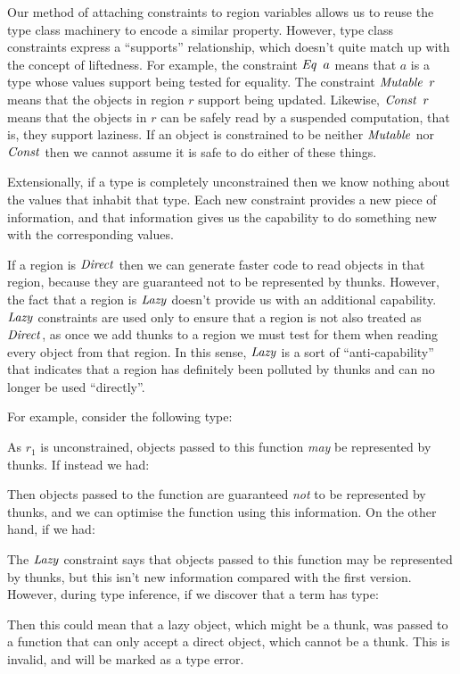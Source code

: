 Our method of attaching constraints to region variables allows us to reuse the type class machinery to encode a similar property. However, type class constraints express a ``supports'' relationship, which doesn't quite match up with the concept of liftedness. For example, the constraint $\operatorname{\mathit{Eq}} \ a$ means that $a$ is a type whose values support being tested for equality. The constraint $\operatorname{\mathit{Mutable}} \ r$ means that the objects in region $r$ support being updated. Likewise, $\iConst \ r$ means that the objects in $r$ can be safely read by a suspended computation, that is, they support laziness. If an object is constrained to be neither $\operatorname{\mathit{Mutable}}$ nor $\operatorname{\mathit{Const}}$ then we cannot assume it is safe to do either of these things. 

Extensionally, if a type is completely unconstrained then we know nothing about the values that inhabit that type. Each new constraint provides a new piece of information, and that information gives us the capability to do something new with the corresponding values.

If a region is $\operatorname{\mathit{Direct}}$ then we can generate faster code to read objects in that region, because they are guaranteed not to be represented by thunks. However, the fact that a region is $\operatorname{\mathit{Lazy}}$ doesn't provide us with an additional capability. $\operatorname{\mathit{Lazy}}$ constraints are used only to ensure that a region is not also treated as $\operatorname{\mathit{Direct}}$, as once we add thunks to a region we must test for them when reading every object from that region. In this sense, $\operatorname{\mathit{Lazy}}$ is a sort of ``anti-capability'' that indicates that a region has definitely been polluted by thunks and can no longer be used ``directly''.

For example, consider the following type:


As $r_1$ is unconstrained, objects passed to this function \emph{may} be represented by thunks. If instead we had:


Then objects passed to the function are guaranteed \emph{not} to be represented by thunks, and we can optimise the function using this information. On the other hand, if we had:


The $\operatorname{\mathit{Lazy}}$ constraint says that objects passed to this function may be represented by thunks, but this isn't new information compared with the first version. However, during type inference, if we discover that a term has type:


Then this could mean that a lazy object, which might be a thunk, was passed to a function that can only accept a direct object, which cannot be a thunk. This is invalid, and will be marked as a type error.

